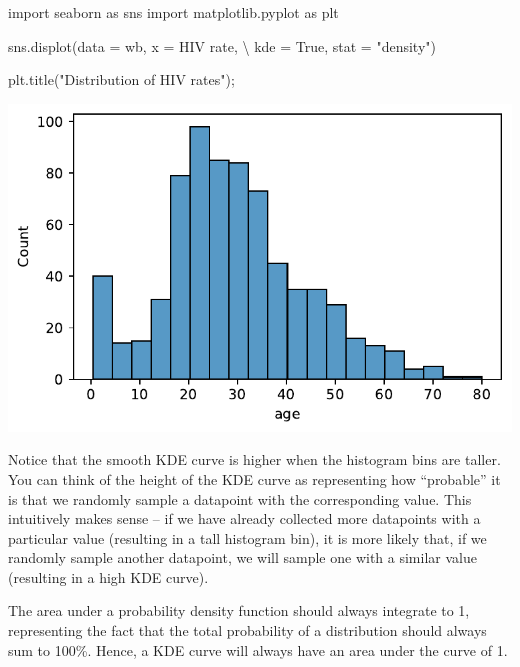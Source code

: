 \documentclass[
  letterpaper,
  DIV=11,
  numbers=noendperiod]{scrreprt}
\newenvironment{Shaded}{\begin{snugshade}}{\end{snugshade}}
\newcommand{\ImportTok}[1]{\textcolor[rgb]{0.00,0.46,0.62}{#1}}
\newcommand{\NormalTok}[1]{\textcolor[rgb]{0.00,0.23,0.31}{#1}}
\newcommand{\OperatorTok}[1]{\textcolor[rgb]{0.37,0.37,0.37}{#1}}
\newcommand{\StringTok}[1]{\textcolor[rgb]{0.13,0.47,0.30}{#1}}
\newcommand{\VariableTok}[1]{\textcolor[rgb]{0.07,0.07,0.07}{#1}}
\begin{document}
\begin{Shaded}
\begin{Highlighting}[]
\ImportTok{import}\NormalTok{ seaborn }\ImportTok{as}\NormalTok{ sns}
\ImportTok{import}\NormalTok{ matplotlib.pyplot }\ImportTok{as}\NormalTok{ plt}

\NormalTok{sns.displot(data }\OperatorTok{=}\NormalTok{ wb, x }\OperatorTok{=} \StringTok{\textquotesingle{}HIV rate\textquotesingle{}}\NormalTok{, }\OperatorTok{\textbackslash{}}
\NormalTok{                       kde }\OperatorTok{=} \VariableTok{True}\NormalTok{, stat }\OperatorTok{=} \StringTok{"density"}\NormalTok{)}

\NormalTok{plt.title(}\StringTok{"Distribution of HIV rates"}\NormalTok{)}\OperatorTok{;}
\end{Highlighting}
\end{Shaded}

\includegraphics{visualization_2/visualization_2_files/figure-pdf/cell-3-output-1.pdf}

Notice that the smooth KDE curve is higher when the histogram bins are
taller. You can think of the height of the KDE curve as representing how
``probable'' it is that we randomly sample a datapoint with the
corresponding value. This intuitively makes sense -- if we have already
collected more datapoints with a particular value (resulting in a tall
histogram bin), it is more likely that, if we randomly sample another
datapoint, we will sample one with a similar value (resulting in a high
KDE curve).

The area under a probability density function should always integrate to
1, representing the fact that the total probability of a distribution
should always sum to 100\%. Hence, a KDE curve will always have an area
under the curve of 1.
\end{document}
